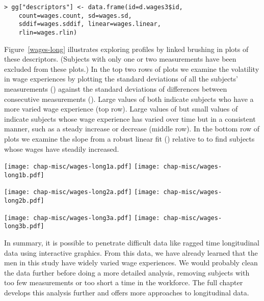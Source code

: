 \begin{verbatim}
> gg["descriptors"] <- data.frame(id=d.wages3$id, 
    count=wages.count, sd=wages.sd, 
    sddif=wages.sddif, linear=wages.linear,
    rlin=wages.rlin)
\end{verbatim}

\noindent 
{} 
Figure~\ref{wages-long} illustrates exploring profiles by linked
brushing in plots of these descriptors. (Subjects with only one or two
measurements have been excluded from these plots.) In the top two rows
of plots we examine the volatility in wage experiences by plotting the
standard deviations of all the subjects' measurements ()
against the standard deviations of differences between consecutive
measurements ().  Large values of both indicate subjects
who have a more varied wage experience (top row). Large values of
 but small values of  indicate subjects whose wage
experience has varied over time but in a consistent manner, such as a
steady increase or decrease (middle row). In the bottom row of plots
we examine the slope from a robust linear fit () relative to
 to find subjects whose wages have steadily increased.

\begin{figure*}[htp]
\vspace{.75in}
\centerline{{\texttt{[image: chap-misc/wages-long1a.pdf]}}
  {\texttt{[image: chap-misc/wages-long1b.pdf]}}}
\centerline{{\texttt{[image: chap-misc/wages-long2a.pdf]}}
  {\texttt{[image: chap-misc/wages-long2b.pdf]}}}
\centerline{{\texttt{[image: chap-misc/wages-long3a.pdf]}}
  {\texttt{[image: chap-misc/wages-long3b.pdf]}}}
\caption[Using linked brushing to explore subject profiles]{Using
linked brushing to explore the wage profiles of individual subjects.}
\label{wages-long}
\end{figure*}

In summary, it is possible to penetrate difficult data like ragged
time longitudinal data using interactive graphics. From this data,
we have already learned that the men in this study have widely varied
wage experiences.  We would probably clean the data further before
doing a more detailed analysis, removing subjects with too few
measurements or too short a time in the workforce. The full chapter
develops this analysis further and offers more approaches to
longitudinal data.

